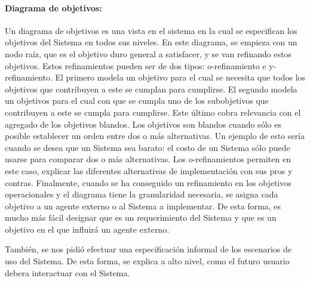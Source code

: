 \documentclass[spanish, 10pt,a4paper]{article}
\numberwithin{equation}{section} %
\begin{document}
\paragraph{Diagrama de objetivos:} Un diagrama de objetivos es una vista en el sistema en la cual se especifican los objetivos del Sistema en todos sus niveles. En este diagrama, se empieza con un nodo raíz, que es el objetivo duro general a satisfacer, y se van refinando estos objetivos. Estos refinamientos pueden ser de dos tipos: o-refinamiento e y-refinamiento. El primero modela un objetivo para el cual se necesita que todos los objetivos que contribuyen a este se cumplan para cumplirse. El segundo modela un objetivos para el cual con que se cumpla uno de los subobjetivos que contribuyen a este se cumpla para cumplirse. Este último cobra relevancia con el agregado de los objetivos blandos. Los objetivos son blandos cuando sólo es posible establecer un orden entre dos o más alternativas. Un ejemplo de esto sería cuando se desea que un Sistema sea barato: el costo de un Sistema sólo puede usarse para comparar dos o más alternativas. Los o-refinamientos permiten en este caso, explicar las diferentes alternativas de implementación con sus pros y contras. Finalmente, cuando se ha conseguido un refinamiento en los objetivos operacionales y el diagrama tiene la granularidad necesaria, se asigna cada objetivo a un agente externo o al Sistema a implementar. De esta forma, es mucho más fácil designar que es un requerimiento del Sistema y que es un objetivo en el que influirá un agente externo.
\vspace{1em}

También, se nos pidió efectuar una especificación informal de los escenarios de uso del Sistema. De esta forma, se explica a alto nivel, como el futuro usuario debera interactuar con el Sistema.
	
\end{document}
